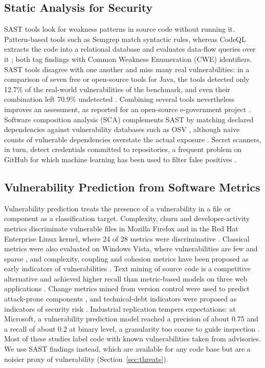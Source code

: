 \documentclass[a4paper,twoside]{article}
\begin{document}
\subsection{Static Analysis for Security}

SAST tools look for weakness patterns in source code without running it. Pattern-based tools such as Semgrep match syntactic rules, whereas CodeQL extracts the code into a relational database and evaluates data-flow queries over it \cite{semgrep,codeql}; both tag findings with Common Weakness Enumeration (CWE) identifiers. SAST tools disagree with one another and miss many real vulnerabilities: in a comparison of seven free or open-source tools for Java, the tools detected only 12.7\% of the real-world vulnerabilities of the benchmark, and even their combination left 70.9\% undetected \cite{li2023}. Combining several tools nevertheless improves an assessment, as reported for an open-source e-government project \cite{nguyenduc2021}. Software composition analysis (SCA) complements SAST by matching declared dependencies against vulnerability databases such as OSV \cite{osv}, although naive counts of vulnerable dependencies overstate the actual exposure \cite{pashchenko2018}. Secret scanners, in turn, detect credentials committed to repositories, a frequent problem on GitHub \cite{meli2019} for which machine learning has been used to filter false positives \cite{lounici2021}.

\subsection{Vulnerability Prediction from Software Metrics}

Vulnerability prediction treats the presence of a vulnerability in a file or component as a classification target. Complexity, churn and developer-activity metrics discriminate vulnerable files in Mozilla Firefox and in the Red Hat Enterprise Linux kernel, where 24 of 28 metrics were discriminative \cite{shin2011}. Classical metrics were also evaluated on Windows Vista, where vulnerabilities are few and sparse \cite{zimmermann2010}, and complexity, coupling and cohesion metrics have been proposed as early indicators of vulnerabilities \cite{chowdhury2011}. Text mining of source code is a competitive alternative \cite{scandariato2014} and achieved higher recall than metric-based models on three web applications \cite{walden2014}. Change metrics mined from version control were used to predict attack-prone components \cite{hein2016}, and technical-debt indicators were proposed as indicators of security risk \cite{siavvas2020}. Industrial replication tempers expectations: at Microsoft, a vulnerability prediction model reached a precision of about 0.75 and a recall of about 0.2 at binary level, a granularity too coarse to guide inspection \cite{morrison2015}. Most of these studies label code with known vulnerabilities taken from advisories. We use SAST findings instead, which are available for any code base but are a noisier proxy of vulnerability (Section~\ref{sec:threats}).
\end{document}
